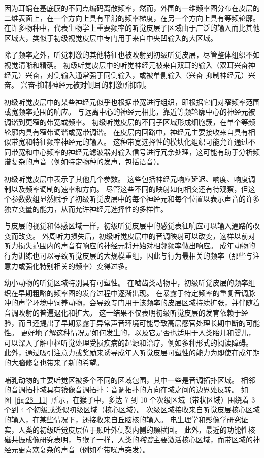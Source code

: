 因为耳蜗在基底膜的不同点编码离散频率，然而，外围的一维频率图分布在皮层的二维表面上，在一个方向上具有平滑的频率梯度，在另一个方向上具有等频轮廓。
在许多物种中，代表生物学上重要频率的听觉皮层子区域由于广泛的输入而比其他区域大，类似于初级视觉皮层中专门用于来自中央凹输入的大区域。


除了频率之外，听觉刺激的其他特征也被映射到初级听觉皮层，尽管整体组织不如视觉清晰和精确。
初级听觉皮层中的听觉神经元被来自双耳的输入（双耳兴奋神经元）兴奋，对侧输入通常强于同侧输入，或被单侧输入（兴奋-抑制神经元）兴奋。
兴奋-抑制神经元被对侧耳的刺激所抑制。


初级听觉皮层中的某些神经元似乎也根据带宽进行组织，即根据它们对窄频率范围或宽频率范围的响应。
与远离中心的神经元相比，靠近等频轮廓中心的神经元被调谐到更窄的带宽或频率。
初级听觉皮层的不同子区域形成细胞簇，在单个等频轮廓内具有窄带调谐或宽带调谐。
在皮层内回路中，神经元主要接收来自具有相似带宽和特征频率神经元的输入。
这种带宽选择性的模块化组织可能允许通过不同带宽和中心频率的神经元滤波器对输入信号进行冗余处理，这可能有助于分析频谱复杂的声音（例如特定物种的发声，包括语音）。


初级听觉皮层中表示了其他几个参数。
这些包括神经元响应延迟、响度、响度调制以及频率调制的速率和方向。
尽管这些不同的映射如何相交还有待观察，但这个参数数组显然赋予了初级听觉皮层中的每个神经元和每个位置以表示声音的许多独立变量的能力，从而允许神经元选择性的多样性。


与皮层的视觉和体感区域一样，初级听觉皮层中的感觉表征响应可以输入通路的改变而改变。
外周听力损失后，初级听觉皮层中的音调映射可以改变，这样以前对听力损失范围内的声音有响应的神经元将开始对相邻频率做出响应。
成年动物的行为训练也可以导致听觉皮层的大规模重组，因此与行为最相关的频率（那些与注意力或强化特别相关的频率）变得过多\cite{zhang2001persistent,merzenich1975representation}。


幼小动物的听觉区域特别具有可塑性。
在啮齿类动物中，初级听觉皮层的频率组织在早期粗略的频率图的发育过程中逐渐出现。
在暴露于特定频率的重复音调脉冲的声学环境中饲养动物，会导致专门用于该频率的皮层区域持续扩张，并伴随着音调映射的普遍退化和扩大。
这一结果不仅表明初级听觉皮层的发育依赖于经验，而且还提出了早期暴露于异常声音环境可能导致高层感官处理长期中断的可能性。
更好地了解这种情况是如何发生的，以及它是否也适用于人类胎儿和婴儿，可以深入了解中枢听觉处理受损疾病的起源和治疗，例如多种形式的阅读障碍。
此外，通过吸引注意力或奖励来诱导成年人听觉皮层可塑性的能力为即使在成年期的大脑修复也带来了新的希望。


哺乳动物的主要听觉区被多个不同的区域包围，其中一些是音调拓扑区域。
相邻的音调拓扑域具有镜像音调拓扑：音调拓扑的方向在域之间的边界处反转。
如图~\ref{fig:28_11}~所示，在猴子中，多达 7 到 10 个次级区域（带状区域）围绕着 3 个到 4 个初级或类似初级区域（核心区域）。
次级区域接收来自听觉皮层核心区域的输入，在某些情况下，还接收来自丘脑核的输入。
电生理学和影像学研究证实，人类的初级听觉皮层位于颞叶外侧裂内侧的颞横回。
此外，最近的功能性核磁共振成像研究表明，与猴子一样，人类的\textit{纯音}主要激活核心区域，而带区域的神经元更喜欢复杂的声音（例如窄带噪声突发）。



